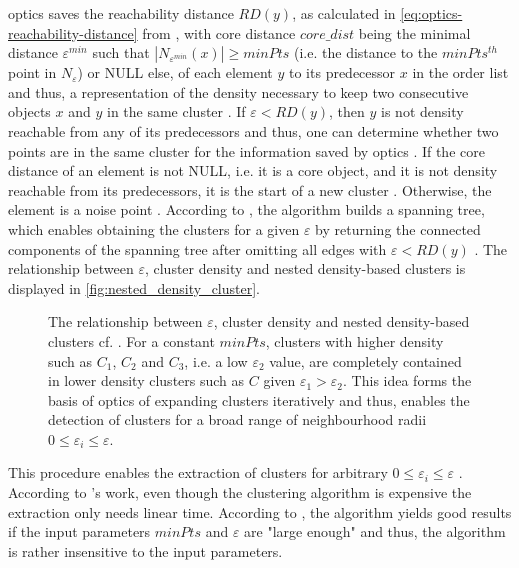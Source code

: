 \ac{optics} saves the reachability distance $RD(y)$, as calculated in \autoref{eq:optics-reachability-distance} from \cite{OPTICS2013},
with core distance $core\_dist$ being the minimal distance $\varepsilon^{min}$ such that $| N_{\varepsilon^{min}} (x) | \geq minPts$ 
(i.e. the distance to the $minPts^{th}$ point in $N_\varepsilon$) or NULL else, 
of each element $y$ to its predecessor $x$ in the order list and thus, 
a representation of the density necessary to keep two consecutive objects $x$ and $y$ in the same cluster \cite{OPTICS2013}.
If $\varepsilon < RD(y)$, then $y$ is not density reachable from any of its predecessors and thus, 
one can determine whether two points are in the same cluster for the information saved by \ac{optics} \cite{OPTICS2013, OPTICS1999}.
If the core distance of an element is not NULL, i.e. it is a core object, and it is not density reachable from its predecessors, it is the start of a new cluster \cite{OPTICS1999}.
Otherwise, the element is a noise point \cite{OPTICS1999}.
According to \citeauthor{OPTICS2013}, the algorithm builds a spanning tree, which enables obtaining the clusters for a given $\varepsilon$ by returning the connected components 
of the spanning tree after omitting all edges with $\varepsilon < RD(y)$ \cite{OPTICS2013}.
The relationship between $\varepsilon$, cluster density and nested density-based clusters is displayed in \autoref{fig:nested_density_cluster}.

\begin{figure}[htp] %
    \centering
    
    \caption[Relationship between $\varepsilon$, cluster density and nested density-based clusters]
    {The relationship between $\varepsilon$, cluster density and nested density-based clusters cf. \cite{OPTICS1999}.
    For a constant $minPts$, clusters with higher density such as $C_1$, $C_2$ and $C_3$, i.e. a low $\varepsilon_2$ value, 
    are completely contained in lower density clusters such as $C$ given $\varepsilon_1 > \varepsilon_2$.
    This idea forms the basis of \ac{optics} of expanding clusters iteratively and thus, 
    enables the detection of clusters for a broad range of neighbourhood radii $0 \le \varepsilon_i \le \varepsilon$.
    }
    \label{fig:nested_density_cluster}
\end{figure}

This procedure enables the extraction of clusters for arbitrary $0 \le \varepsilon_i \le \varepsilon$ \cite{OPTICS_kMeans_2016, OPTICS1999}.
According to \citeauthor{OPTICS2013}'s work, even though the clustering algorithm is expensive the extraction only needs linear time.
According to \cite{OPTICS1999}, the algorithm yields good results if the input parameters $minPts$ and $\varepsilon$ are "large enough" and thus, the algorithm is rather insensitive to the input parameters.

